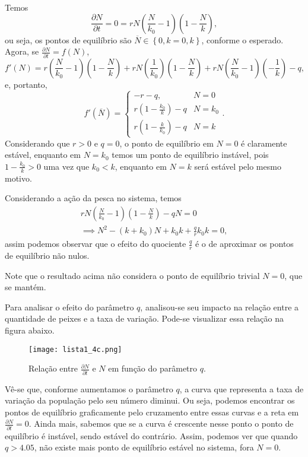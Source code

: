 \documentclass[a4paper]{report}
\begin{document}


Temos \[
\frac{\partial N}{\partial t} = 0 = rN\left( \frac{N}{k_0}-1 \right) \left( 1-\frac{N}{k} \right) 
,\] ou seja, os pontos de equilíbrio são $\overline{N} \in \left\{ 0, k=0, k \right\}$, conforme o esperado. Agora, se $\frac{\partial N}{\partial t} = f(N)$, \[
f'(N) = r\left( \frac{N}{k_0}-1 \right) \left( 1-\frac{N}{k} \right) +rN\left( \frac{1}{k_0} \right) \left( 1-\frac{N}{k} \right) + rN\left( \frac{N}{k_0}-1 \right) \left( -\frac{1}{k} \right) -q
,\] e, portanto, \[
f'(\overline{N}) = \begin{cases}
    -r-q, & N=0 \\
    r\left( 1-\frac{k_0}{k} \right) -q & N=k_0 \\
    r\left( 1-\frac{k}{k_0} \right) -q & N=k
\end{cases}
.\] Considerando que $r>0$ e $q=0$, o ponto de equilíbrio em $N=0$ é claramente estável, enquanto em $N=k_0$ temos um ponto de equilíbrio instável, pois $1-\frac{k_0}{k}>0$ uma vez que $k_0<k$, enquanto em $N=k$ será estável pelo mesmo motivo.


Considerando a ação da pesca no sistema, temos
\begin{align*}
    rN\left( \frac{N}{k_0}-1 \right) \left( 1-\frac{N}{k} \right) -qN = 0 \\
    \implies N^2 - \left( k+k_0 \right) N +k_0k +\frac{q}{r}k_0k = 0
,\end{align*}
assim podemos observar que o efeito do quociente $\frac{q}{r}$ é o de aproximar os pontos de equilíbrio não nulos.

Note que o resultado acima não considera o ponto de equilíbrio trivial $N=0$, que se mantém.


Para analisar o efeito do parâmetro $q$, analisou-se seu impacto na relação entre a quantidade de peixes e a taxa de variação. Pode-se visualizar essa relação na figura abaixo.

\begin{figure}[H]
    \centering
    \texttt{[image: lista1\_4c.png]}
    \caption{Relação entre $\frac{\partial N}{\partial t} $ e $N$ em função do parâmetro $q$.}
    \label{fig:lista1_4b-png}
\end{figure}

Vê-se que, conforme aumentamos o parâmetro $q$, a curva que representa a taxa de variação da população pelo seu número diminui. Ou seja, podemos encontrar os pontos de equilíbrio graficamente pelo cruzamento entre essas curvas e a reta em $\frac{\partial N}{\partial t} =0$. Ainda mais, sabemos que se a curva é crescente nesse ponto o ponto de equilíbrio é instável, sendo estável do contrário. Assim, podemos ver que quando $q>4.05$, não existe mais ponto de equilíbrio estável no sistema, fora $N=0$.
\end{document}

